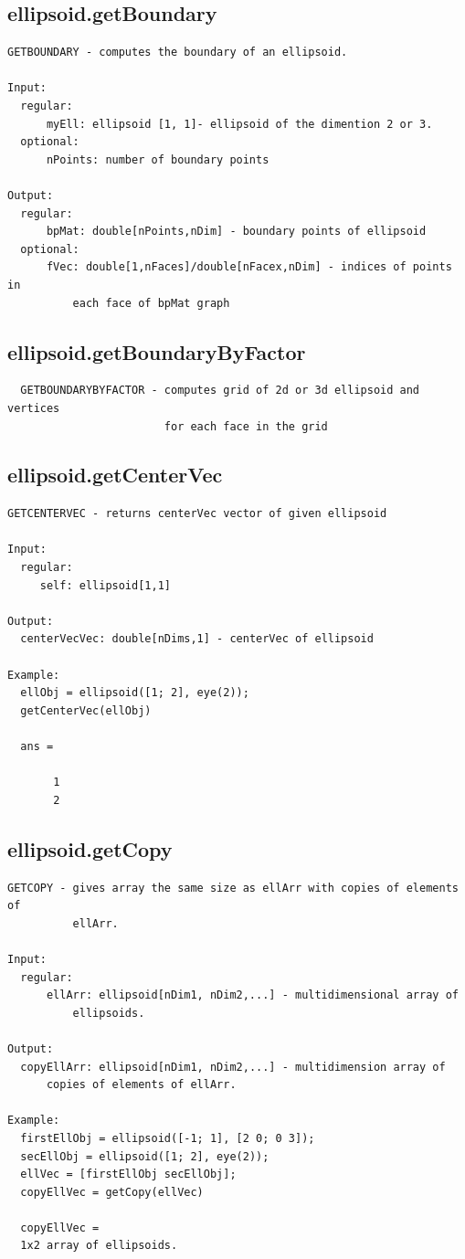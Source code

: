 \subsection{\texorpdfstring{ellipsoid.getBoundary}{getBoundary}}\label{method:ellipsoid.getBoundary}
\begin{verbatim}
GETBOUNDARY - computes the boundary of an ellipsoid.

Input:
  regular:
      myEll: ellipsoid [1, 1]- ellipsoid of the dimention 2 or 3.
  optional:
      nPoints: number of boundary points

Output:
  regular:
      bpMat: double[nPoints,nDim] - boundary points of ellipsoid
  optional:
      fVec: double[1,nFaces]/double[nFacex,nDim] - indices of points in
          each face of bpMat graph
\end{verbatim}
\subsection{\texorpdfstring{ellipsoid.getBoundaryByFactor}{getBoundaryByFactor}}\label{method:ellipsoid.getBoundaryByFactor}
\begin{verbatim}
  GETBOUNDARYBYFACTOR - computes grid of 2d or 3d ellipsoid and vertices
                        for each face in the grid
\end{verbatim}
\subsection{\texorpdfstring{ellipsoid.getCenterVec}{getCenterVec}}\label{method:ellipsoid.getCenterVec}
\begin{verbatim}
GETCENTERVEC - returns centerVec vector of given ellipsoid

Input:
  regular:
     self: ellipsoid[1,1]

Output:
  centerVecVec: double[nDims,1] - centerVec of ellipsoid

Example:
  ellObj = ellipsoid([1; 2], eye(2));
  getCenterVec(ellObj)

  ans =

       1
       2
\end{verbatim}
\subsection{\texorpdfstring{ellipsoid.getCopy}{getCopy}}\label{method:ellipsoid.getCopy}
\begin{verbatim}
GETCOPY - gives array the same size as ellArr with copies of elements of
          ellArr.

Input:
  regular:
      ellArr: ellipsoid[nDim1, nDim2,...] - multidimensional array of
          ellipsoids.

Output:
  copyEllArr: ellipsoid[nDim1, nDim2,...] - multidimension array of
      copies of elements of ellArr.

Example:
  firstEllObj = ellipsoid([-1; 1], [2 0; 0 3]);
  secEllObj = ellipsoid([1; 2], eye(2));
  ellVec = [firstEllObj secEllObj];
  copyEllVec = getCopy(ellVec)

  copyEllVec =
  1x2 array of ellipsoids.
\end{verbatim}
